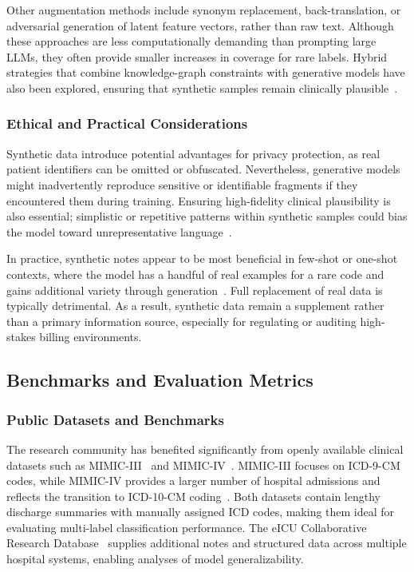 Other augmentation methods include synonym replacement, back-translation, or adversarial generation of latent feature vectors, rather than raw text. Although these approaches are less computationally demanding than prompting large LLMs, they often provide smaller increases in coverage for rare labels. Hybrid strategies that combine knowledge-graph constraints with generative models have also been explored, ensuring that synthetic samples remain clinically plausible~\citep{falis2022horsestozebras}.

\subsubsection{Ethical and Practical Considerations}

Synthetic data introduce potential advantages for privacy protection, as real patient identifiers can be omitted or obfuscated. Nevertheless, generative models might inadvertently reproduce sensitive or identifiable fragments if they encountered them during training. Ensuring high-fidelity clinical plausibility is also essential; simplistic or repetitive patterns within synthetic samples could bias the model toward unrepresentative language~\citep{pollard2018eicu}.

In practice, synthetic notes appear to be most beneficial in few-shot or one-shot contexts, where the model has a handful of real examples for a rare code and gains additional variety through generation~\citep{rios2018few}. Full replacement of real data is typically detrimental. As a result, synthetic data remain a supplement rather than a primary information source, especially for regulating or auditing high-stakes billing environments.

\subsection{Benchmarks and Evaluation Metrics}\label{sec:p1:benchmarks}

\subsubsection{Public Datasets and Benchmarks}

The research community has benefited significantly from openly available clinical datasets such as MIMIC-III~\citep{johnson2016mimic} and MIMIC-IV~\citep{johnson2023mimicivscidata}. MIMIC-III focuses on ICD-9-CM codes, while MIMIC-IV provides a larger number of hospital admissions and reflects the transition to ICD-10-CM coding~\citep{nguyen2023mimicivicd}. Both datasets contain lengthy discharge summaries with manually assigned ICD codes, making them ideal for evaluating multi-label classification performance. The eICU Collaborative Research Database~\citep{pollard2018eicu} supplies additional notes and structured data across multiple hospital systems, enabling analyses of model generalizability.

